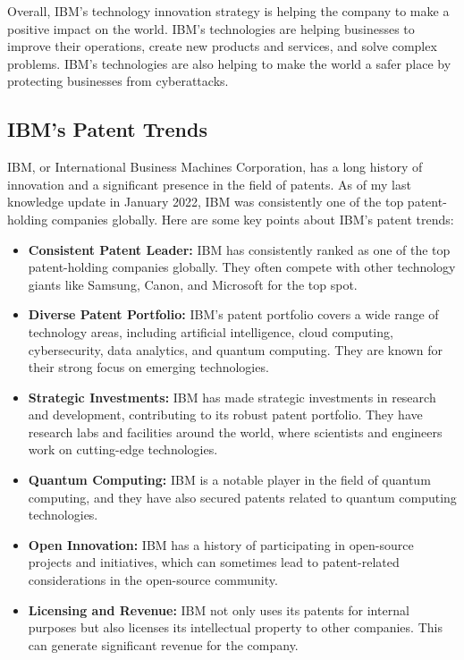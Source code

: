 Overall, IBM's technology innovation strategy is helping the company to make a positive impact on the world. IBM's technologies are helping businesses to improve their operations, create new products and services, and solve complex problems. IBM's technologies are also helping to make the world a safer place by protecting businesses from cyberattacks.

\subsection{IBM's Patent Trends}
IBM, or International Business Machines Corporation, has a long history of innovation and a significant presence in the field of patents. As of my last knowledge update in January 2022, IBM was consistently one of the top patent-holding companies globally. Here are some key points about IBM's patent trends:


\begin{itemize}
  \item \textbf{Consistent Patent Leader:} IBM has consistently ranked as one of the top patent-holding companies globally. They often compete with other technology giants like Samsung, Canon, and Microsoft for the top spot.

  \item \textbf{Diverse Patent Portfolio:} IBM's patent portfolio covers a wide range of technology areas, including artificial intelligence, cloud computing, cybersecurity, data analytics, and quantum computing. They are known for their strong focus on emerging technologies.

  \item \textbf{Strategic Investments:} IBM has made strategic investments in research and development, contributing to its robust patent portfolio. They have research labs and facilities around the world, where scientists and engineers work on cutting-edge technologies.

  \item \textbf{Quantum Computing:} IBM is a notable player in the field of quantum computing, and they have also secured patents related to quantum computing technologies.

  \item \textbf{Open Innovation:} IBM has a history of participating in open-source projects and initiatives, which can sometimes lead to patent-related considerations in the open-source community.

  \item \textbf{Licensing and Revenue:} IBM not only uses its patents for internal purposes but also licenses its intellectual property to other companies. This can generate significant revenue for the company.
\end{itemize}

